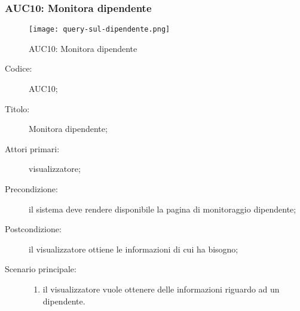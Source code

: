 \documentclass[../../../analisi-dei-requisiti.tex]{subfiles}
\begin{document}
\subsubsection{AUC10: Monitora dipendente}%
\label{subs:AUC10}

\begin{figure}[H]
  \centering
  \texttt{[image: query-sul-dipendente.png]}
  \caption{AUC10: Monitora dipendente}%
  \label{fig:AUC10}
\end{figure}

\begin{description}
  \item[Codice:] AUC10;
  \item[Titolo:] Monitora dipendente;
  \item[Attori primari:] visualizzatore;
  \item[Precondizione:]  il sistema deve rendere disponibile la pagina di monitoraggio dipendente;
  \item[Postcondizione:] il visualizzatore ottiene le informazioni di cui ha bisogno;
  \item[Scenario principale:]
  \begin{enumerate}
    \item il visualizzatore vuole ottenere delle informazioni riguardo ad un dipendente.
  \end{enumerate}
\end{description}
\end{document}

